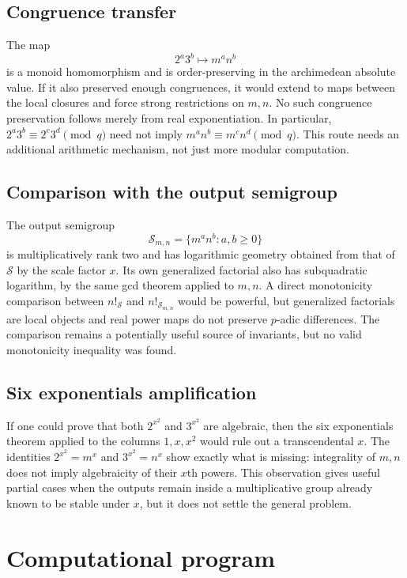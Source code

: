 \documentclass[11pt]{article}
\theoremstyle{definition}
\theoremstyle{remark}
\newcommand{\calS}{\mathcal S}
\begin{document}
\subsection{Congruence transfer}
The map
\[
       2^a3^b\longmapsto m^a n^b
\]
is a monoid homomorphism and is order-preserving in the archimedean absolute value.  If it also preserved enough congruences, it would extend to maps between the local closures and force strong restrictions on $m,n$.  No such congruence preservation follows merely from real exponentiation.  In particular,
$2^a3^b\equiv2^c3^d\pmod q$ need not imply
$m^a n^b\equiv m^c n^d\pmod q$.  This route needs an additional arithmetic mechanism, not just more modular computation.

\subsection{Comparison with the output semigroup}
The output semigroup
\[
       \calS_{m,n}=\{m^a n^b:a,b\ge0\}
\]
is multiplicatively rank two and has logarithmic geometry obtained from that of $\calS$ by the scale factor $x$.  Its own generalized factorial also has subquadratic logarithm, by the same gcd theorem applied to $m,n$.  A direct monotonicity comparison between $n!_{\calS}$ and $n!_{\calS_{m,n}}$ would be powerful, but generalized factorials are local objects and real power maps do not preserve $p$-adic differences.  The comparison remains a potentially useful source of invariants, but no valid monotonicity inequality was found.

\subsection{Six exponentials amplification}
If one could prove that both $2^{x^2}$ and $3^{x^2}$ are algebraic, then the six exponentials theorem applied to the columns $1,x,x^2$ would rule out a transcendental $x$.  The identities
$2^{x^2}=m^x$ and $3^{x^2}=n^x$ show exactly what is missing: integrality of $m,n$ does not imply algebraicity of their $x$th powers.  This observation gives useful partial cases when the outputs remain inside a multiplicative group already known to be stable under $x$, but it does not settle the general problem.

\section{Computational program}
\end{document}
